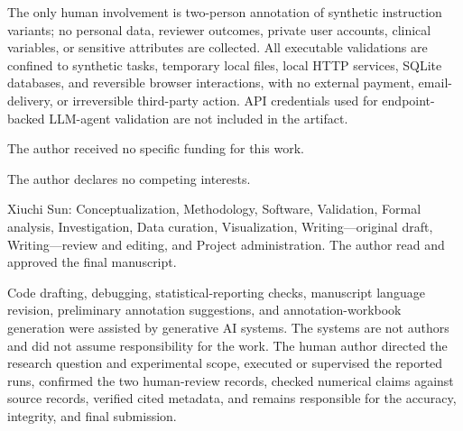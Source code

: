 \documentclass[pdflatex,sn-apa]{sn-jnl}
\begin{document}

The only human involvement is two-person annotation of synthetic instruction variants; no personal data, reviewer outcomes, private user accounts, clinical variables, or sensitive attributes are collected. All executable validations are confined to synthetic tasks, temporary local files, local HTTP services, SQLite databases, and reversible browser interactions, with no external payment, email-delivery, or irreversible third-party action. API credentials used for endpoint-backed LLM-agent validation are not included in the artifact.


The author received no specific funding for this work.


The author declares no competing interests.


Xiuchi Sun: Conceptualization, Methodology, Software, Validation, Formal analysis, Investigation, Data curation, Visualization, Writing---original draft, Writing---review and editing, and Project administration. The author read and approved the final manuscript.


Code drafting, debugging, statistical-reporting checks, manuscript language revision, preliminary annotation suggestions, and annotation-workbook generation were assisted by generative AI systems. The systems are not authors and did not assume responsibility for the work. The human author directed the research question and experimental scope, executed or supervised the reported runs, confirmed the two human-review records, checked numerical claims against source records, verified cited metadata, and remains responsible for the accuracy, integrity, and final submission.


\end{document}

